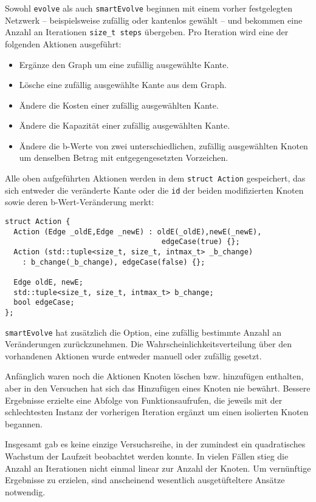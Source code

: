 Sowohl \lstinline|evolve| als auch \lstinline|smartEvolve| beginnen mit einem vorher festgelegten Netzwerk -- beispielsweise zufällig oder kantenlos gewählt -- und bekommen eine Anzahl an Iterationen \lstinline|size_t steps| übergeben. Pro Iteration wird eine der folgenden Aktionen ausgeführt:
\begin{itemize}\itemsep0em
    \item Ergänze den Graph um eine zufällig ausgewählte Kante.
    \item Lösche eine zufällig ausgewählte Kante aus dem Graph.
    \item Ändere die Kosten einer zufällig ausgewählten Kante.
    \item Ändere die Kapazität einer zufällig ausgewählten Kante.
    \item Ändere die b-Werte von zwei unterschiedlichen, zufällig ausgewählten Knoten um denselben Betrag mit entgegengesetzten Vorzeichen.
\end{itemize}

Alle oben aufgeführten Aktionen werden in dem \lstinline|struct Action| gespeichert, das sich entweder die veränderte Kante oder die \lstinline|id| der beiden modifizierten Knoten sowie deren b-Wert-Veränderung merkt:

\begin{lstlisting}
struct Action {
  Action (Edge _oldE,Edge _newE) : oldE(_oldE),newE(_newE),
                                    edgeCase(true) {};
  Action (std::tuple<size_t, size_t, intmax_t> _b_change)
    : b_change(_b_change), edgeCase(false) {};

  Edge oldE, newE;
  std::tuple<size_t, size_t, intmax_t> b_change;
  bool edgeCase;
};
\end{lstlisting}

\lstinline|smartEvolve| hat zusätzlich die Option, eine zufällig bestimmte Anzahl an Veränderungen zurückzunehmen. Die Wahrscheinlichkeitsverteilung über den vorhandenen Aktionen wurde entweder manuell oder zufällig gesetzt. 

Anfänglich waren noch die Aktionen Knoten löschen bzw. hinzufügen enthalten, aber in den Versuchen hat sich das Hinzufügen eines Knoten nie bewährt. Bessere Ergebnisse erzielte eine Abfolge von Funktionsaufrufen, die jeweils mit der schlechtesten Instanz der vorherigen Iteration ergänzt um einen isolierten Knoten begannen.

Insgesamt gab es keine einzige Versuchsreihe, in der zumindest ein quadratisches Wachstum der Laufzeit beobachtet werden konnte. In vielen Fällen stieg die Anzahl an Iterationen nicht einmal linear zur Anzahl der Knoten. Um vernünftige Ergebnisse zu erzielen, sind anscheinend wesentlich ausgetüfteltere Ansätze notwendig.